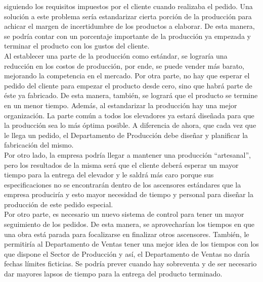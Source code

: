 \documentclass[a4paper,10pt,titlepage]{article}
\begin{document}
\begin{itemize}
	siguiendo los requisitos impuestos por el cliente cuando realizaba el pedido. Una solución a este problema sería estandarizar cierta porción de la 
	producción para achicar el margen de incertidumbre de los productos a elaborar. De esta manera, se podría contar con un porcentaje importante de la 
	producción ya empezada y terminar el producto con los gustos del cliente. \\
	Al establecer una parte de la producción como estándar, se lograría una reducción en los costos de producción, por ende, se puede vender más barato, 
	mejorando la competencia en el mercado. Por otra parte, no hay que esperar el pedido del cliente para empezar el producto desde cero, sino que habrá 
	parte de éste ya fabricado. De esta manera, también, se logrará que el producto se termine en un menor tiempo.
	Además, al estandarizar la producción hay una mejor organización. La parte común a todos los elevadores ya estará diseñada para que la producción 
	sea lo más óptima posible. A diferencia de ahora, que cada vez que le llega un pedido, el Departamento de Producción debe diseñar y planificar la 
	fabricación del mismo.\\
	Por otro lado, la empresa podría llegar a mantener una producción “artesanal”, pero los resultados de la misma será que el cliente deberá esperar 
	un mayor tiempo para la entrega del elevador y le saldrá más caro porque sus especificaciones no se encontrarán dentro de los ascensores estándares que
	 la empresa produciría y esto mayor necesidad de tiempo y personal para diseñar la producción de este pedido especial. \\
	Por otro parte, es necesario un nuevo sistema de control para tener un mayor seguimiento de los pedidos. De esta manera, se aprovecharían los tiempos 
	en que una obra está parada para focalizarse en finalizar otros ascensores. También, le permitiría al Departamento de Ventas tener una mejor idea de los 
	tiempos con los que dispone el Sector de Producción y así, el Departamento de Ventas no daría fechas límites ficticias. Se podría prever cuando hay sobreventa 
	y de ser necesario dar mayores lapsos de tiempo para la entrega del producto terminado.  
\end{itemize}
\end{document}
